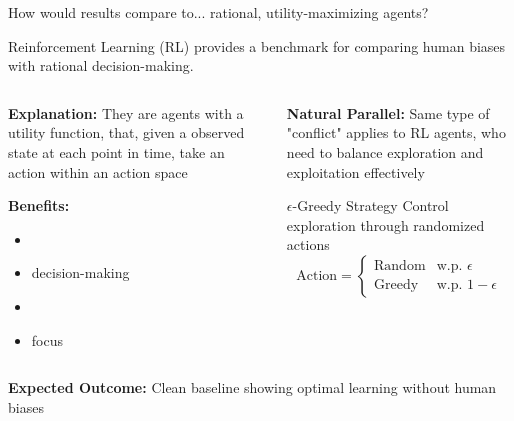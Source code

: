 \begin{frame}{How would results compare to... rational, utility-maximizing agents?}
    
	Reinforcement Learning (RL) provides a benchmark for comparing human biases with rational decision-making.


	\bigskip 
    \begin{columns}
        \begin{column}{0.45\textwidth}
			\textbf{Explanation:} They are agents with a utility function, that, given a observed state at each point in time, take an action within an action space

			\bigskip
            \textbf{Benefits:}
            \begin{itemize}
                \item {}
                \item {} decision-making
                \item {}
                \item {} focus
            \end{itemize}
        \end{column}

        \begin{column}{0.45\textwidth}
			\textbf{Natural Parallel:} Same type of "conflict" applies to RL agents, who need to balance exploration and exploitation effectively
            \begin{exampleblock}{$\epsilon$-Greedy Strategy}
                Control exploration through randomized actions
                \[\text{Action} = \begin{cases} 
                \text{Random} & \text{w.p. } \epsilon \\
                \text{Greedy} & \text{w.p. } 1-\epsilon
                \end{cases}\]
            \end{exampleblock}
        \end{column}
    \end{columns}
    
    \bigskip
    \textbf{Expected Outcome:} Clean baseline showing optimal learning without human biases
\end{frame}

